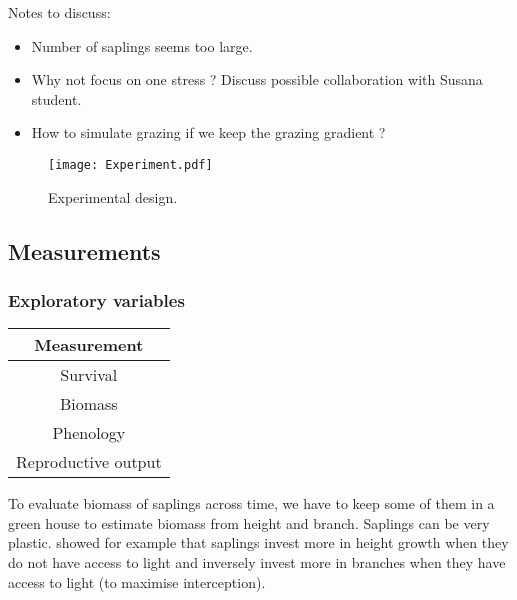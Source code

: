 \documentclass[12pt]{article} %
\begin{document}
Notes to discuss:
\begin{itemize}
	\item Number of saplings seems too large.
	\item Why not focus on one stress ? Discuss possible collaboration with Susana student.
	\item How to simulate grazing if we keep the grazing gradient ?
\end{itemize}

\begin{figure} %
\begin{center}
\texttt{[image: Experiment.pdf]}
\end{center}
\caption{Experimental design.\label{exp}}
\end{figure}

\subsection{Measurements}

\subsubsection{Exploratory variables}
\begin{table}[h]
\begin{center}
\begin{tabular}{c}
Measurement \\ 
\hline
Survival \\ 
Biomass \\ 
Phenology \\ 
Reproductive output \\
\hline 
\end{tabular}
\end{center}
\end{table} 
To evaluate biomass of saplings across time, we have to keep some of them in a green house to estimate biomass from height and branch. Saplings can be very plastic. \citep{Bonser1994} showed for example that saplings invest more in height growth when they do not have access to light and inversely invest more in branches when they have access to light (to maximise interception). 
\end{document}
